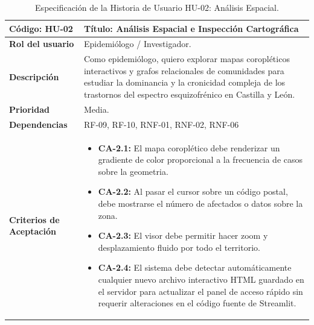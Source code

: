 \documentclass[12pt,a4paper,onecolumn,oneside]{report}
\begin{document}
\begin{table}[htbp]
\centering
\small
\renewcommand{\arraystretch}{1.0}
\begin{tabular}{|p{3.5cm}|p{10.5cm}|}
\hline
\rowcolor[RGB]{239,239,239} 
\textbf{Código: HU-02} & \textbf{Título: Análisis Espacial e Inspección Cartográfica} \\ \hline
\textbf{Rol del usuario} & Epidemiólogo / Investigador. \\ \hline
\textbf{Descripción} & Como epidemiólogo, quiero explorar mapas coropléticos interactivos y grafos relacionales de comunidades para estudiar la dominancia y la cronicidad compleja de los trastornos del espectro esquizofrénico en Castilla y León. \\ \hline
\textbf{Prioridad} & Media. \\ \hline
\textbf{Dependencias} & RF-09, RF-10, RNF-01, RNF-02, RNF-06 \\ \hline
\textbf{Criterios de Aceptación} & 
\begin{itemize}[leftmargin=*]
    \item \textbf{CA-2.1:} El mapa coroplético debe renderizar un gradiente de color proporcional a la frecuencia de casos sobre la geometria.
    \item \textbf{CA-2.2:} Al pasar el cursor sobre un código postal, debe mostrarse el número de afectados o datos sobre la zona.
    \item \textbf{CA-2.3:} El visor debe permitir hacer zoom y desplazamiento fluido por todo el territorio.
    \item \textbf{CA-2.4:} El sistema debe detectar automáticamente cualquier nuevo archivo interactivo HTML guardado en el servidor para actualizar el panel de acceso rápido sin requerir alteraciones en el código fuente de Streamlit.
\end{itemize} \\ \hline
\end{tabular}
\caption{Especificación de la Historia de Usuario HU-02: Análisis Espacial.}
\label{tab:hu_02}
\end{table}
\end{document}
